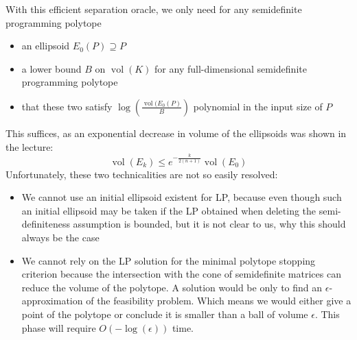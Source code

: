 \documentclass{scrartcl}
\newcommand{\vol}{\operatorname{vol}}
\begin{document}
\begin{enumerate}
With this efficient separation oracle, we only need for any semidefinite programming polytope
\begin{itemize}
\item an ellipsoid $E_0(P) \supseteq P$
\item a lower bound $B$ on $\vol (K)$ for any full-dimensional semidefinite programming polytope
\item that these two satisfy  $\log(\frac{\vol(E_0(P)}{B})$ polynomial in the input size of $P$
\end{itemize} 
This suffices, as an exponential decrease in volume of the ellipsoids was shown in the lecture:
\[
\vol(E_k)\le e^{-\frac{k}{2(n+1)}} \vol(E_0)
\]
Unfortunately, these two technicalities are not so easily resolved:
\begin{itemize}
\item We cannot use an initial ellipsoid existent for LP, because even though such an initial ellipsoid may be taken if the LP obtained when deleting the semi-definiteness assumption is bounded, but it is not clear to us, why this should always be the case
\item We cannot rely on the LP solution for the minimal polytope stopping criterion because the intersection with the cone of semidefinite matrices can reduce the volume of the polytope. A solution would be only to find an $\epsilon$-approximation of the feasibility problem. Which means we would either give a point of the polytope or conclude it is smaller than a ball of volume $\epsilon$. This phase will require $O(-\log(\epsilon))$ time.
\end{itemize}



\end{enumerate}
\end{document}
